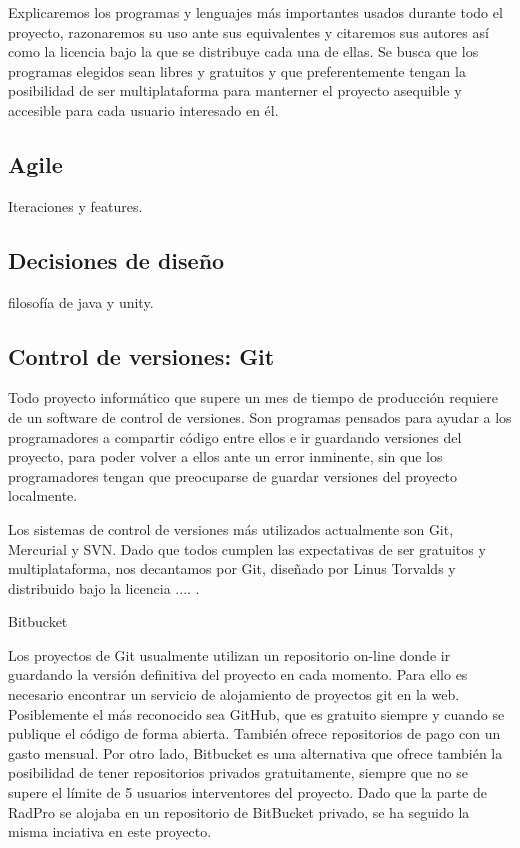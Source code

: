 \documentclass[12pt,a4paper,openright,oneside]{article}
\numberwithin{equation}{section}
\theoremstyle{definition}
\begin{document}
Explicaremos los programas y lenguajes más importantes usados durante todo el proyecto, razonaremos su uso ante sus equivalentes y citaremos sus autores así como la licencia bajo la que se distribuye cada una de ellas. Se busca que los programas elegidos sean libres y gratuitos y que preferentemente tengan la posibilidad de ser multiplataforma para manterner el proyecto asequible y accesible para cada usuario interesado en él.

\subsection{ Agile }
Iteraciones y features.
\subsection{ Decisiones de diseño }
filosofía de java y unity.
\subsection{ Control de versiones: Git }

Todo proyecto informático que supere un mes de tiempo de producción requiere de un software de control de versiones. Son programas pensados para ayudar a los programadores a compartir código entre ellos e ir guardando versiones del proyecto, para poder volver a ellos ante un error inminente, sin que los programadores tengan que preocuparse de guardar versiones del proyecto localmente. 

Los sistemas de control de versiones más utilizados actualmente son Git, Mercurial y SVN. Dado que todos cumplen las expectativas de ser gratuitos y multiplataforma, nos decantamos por Git, diseñado por Linus Torvalds y distribuido bajo la licencia .... .

Bitbucket

Los proyectos de Git usualmente utilizan un repositorio on-line donde ir guardando la versión definitiva del proyecto en cada momento. Para ello es necesario encontrar un servicio de alojamiento de proyectos git en la web. Posiblemente el más reconocido sea GitHub, que es gratuito siempre y cuando se publique el código de forma abierta. También ofrece repositorios de pago con un gasto mensual. Por otro lado, Bitbucket es una alternativa que ofrece también la posibilidad de tener repositorios privados gratuitamente, siempre que no se supere el límite de 5 usuarios interventores del proyecto. Dado que la parte de RadPro se alojaba en un repositorio de BitBucket privado, se ha seguido la misma inciativa en este proyecto.
\end{document}
